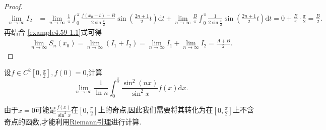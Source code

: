 \documentclass[../../main.tex]{subfiles}%
\begin{document}
\begin{proof}
\begin{align*}
\lim_{n\rightarrow \infty} I_2&=\lim_{n\rightarrow \infty} \frac{1}{\pi}\int_0^{\pi}{\frac{f(x_0 - t) - B}{2\sin \frac{t}{2}}\sin \left( \frac{2n + 1}{2}t \right) \mathrm{d}t}+\lim_{n\rightarrow \infty} \frac{B}{\pi}\int_0^{\pi}{\frac{1}{2\sin \frac{t}{2}}\sin \left( \frac{2n + 1}{2}t \right) \mathrm{d}t}
=0 + \frac{B}{\pi}\cdot \frac{\pi}{2}
=\frac{B}{2}.
\end{align*}
再结合 \eqref{example4.59-1.1}式可得
\begin{align*}
\lim_{n\rightarrow \infty} S_n(x_0)=\lim_{n\rightarrow \infty} (I_1 + I_2)
=\lim_{n\rightarrow \infty} I_1 + \lim_{n\rightarrow \infty} I_2
=\frac{A + B}{2}.
\end{align*}
\end{proof}

\begin{example}
设\(f\in C^{2}[0,\frac{\pi}{2}],f(0)=0\),计算
\[
\lim_{n\rightarrow\infty}\frac{1}{\ln n}\int_{0}^{\frac{\pi}{2}}\frac{\sin^{2}(nx)}{\sin^{2}x}f(x)\mathrm{d}x.
\]
\end{example}
\begin{remark}
由于\(x = 0\)可能是\(\frac{f(x)}{\sin^2x}\)在\(\left[0, \frac{\pi}{2}\right]\)上的奇点,因此我们需要将其转化为在\(\left[0, \frac{\pi}{2}\right]\)上不含奇点的函数,才能利用\hyperref[theorem:Riemann引理]{Riemann引理}进行计算.
\end{remark}
\end{document}
